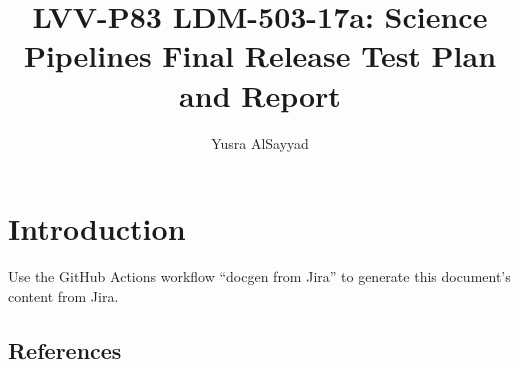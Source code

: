 \documentclass[DM,lsstdraft,toc]{lsstdoc}
\begin{document}
\def\milestoneName{LDM-503-17a: Science Pipelines Final Release}
\def\milestoneId{LVV-P83}
\def\product{Data Management}


\title{LVV-P83 LDM-503-17a: Science Pipelines Final Release Test Plan and Report}
\setDocRef{\lsstDocType-\lsstDocNum}
\date{\vcsDate}
\author{Yusra AlSayyad}




\maketitle

\section{Introduction}
Use the GitHub Actions workflow ``docgen from Jira'' to generate this document's content from Jira.

\subsection{References}
\label{sect:references}
\renewcommand{\refname}{}




\end{document}
